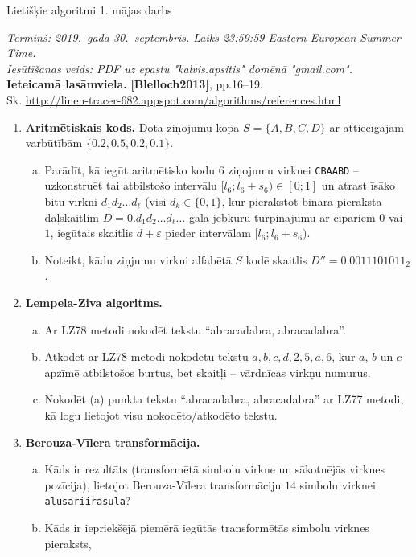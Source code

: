 \documentclass[11pt]{article}
\begin{document}
\thispagestyle{empty}

{\Large Lietišķie algoritmi \textendash{} 1. mājas darbs}

\noindent
{\em Termiņš: 2019.\ gada 30.\ septembris. Laiks 23:59:59 Eastern European Summer Time.}\\
{\em Iesūtīšanas veids: PDF uz epastu "kalvis.apsitis" domēnā "gmail.com".}\\
{\bf Ieteicamā lasāmviela.} {\bf [Blelloch2013]}, pp.16--19.\\
Sk. \url{http://linen-tracer-682.appspot.com/algorithms/references.html}

\begin{enumerate}
\item {\bf Aritmētiskais kods.} 
Dota ziņojumu kopa $S = \{ A,B,C,D \}$ ar attiecīgajām varbūtībām 
$\{ 0.2, 0.5, 0.2, 0.1 \}$.
\begin{enumerate}[(a)]
\item Parādīt, kā iegūt aritmētisko kodu $6$ ziņojumu virknei {\tt CBAABD} -- uzkonstruēt
tai atbilstošo intervālu $[l_6;l_6+s_6) \in [0;1]$ un atrast 
īsāko bitu virkni $d_1d_2\ldots{}d_{\ell}$ (visi $d_k \in \{ 0,1 \}$, 
kur pierakstot binārā pieraksta daļskaitlim $D = 0.d_1d_2\ldots{}d_{\ell}\ldots$ 
galā jebkuru turpinājumu ar cipariem $0$ vai $1$, iegūtais skaitlis $d+\varepsilon$ pieder
intervālam $[l_6;l_6+s_6)$.
\item Noteikt, kādu ziņjumu virkni alfabētā $S$ kodē skaitlis 
$D'' = 0.0011101011_2$.
\end{enumerate}
\item {\bf Lempela-Ziva algoritms.} 
\begin{enumerate}[(a)]
\item 
Ar LZ78 metodi nokodēt tekstu “abracadabra, abracadabra”.
\item Atkodēt ar LZ78 metodi nokodētu tekstu $a,b,c,d,2,5,a,6$, kur
$a$, $b$ un $c$ apzīmē atbilstošos burtus, bet skaitļi – vārdnīcas virkņu
numurus.
\item
Nokodēt (a) punkta tekstu “abracadabra, abracadabra” 
ar LZ77 metodi, kā logu lietojot visu nokodēto/atkodēto tekstu.
\end{enumerate}
\item {\bf Berouza-Vīlera transformācija.}
\begin{enumerate}[(a)]
\item 
Kāds ir rezultāts (transformētā simbolu virkne un sākotnējās virknes pozīcija), 
lietojot Berouza-Vīlera transformāciju 
$14$ simbolu virknei {\tt alusariirasula}?
\item Kāds ir iepriekšējā piemērā iegūtās transformētās simbolu virknes pieraksts,

\end{enumerate}
\end{enumerate}
\end{document}
